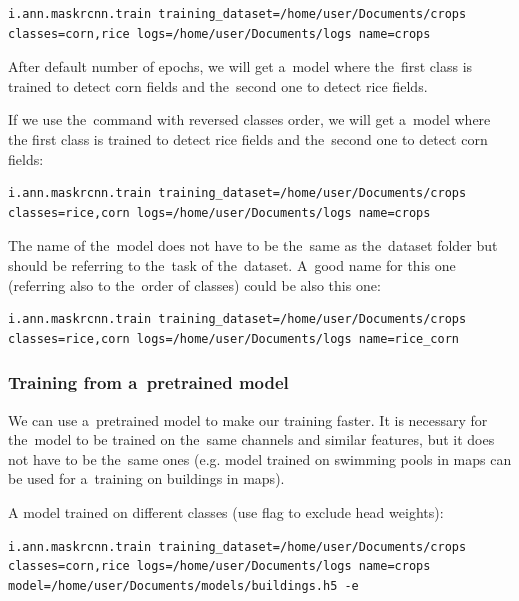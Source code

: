 {\footnotesize
\begin{lstlisting}[breaklines=true]
i.ann.maskrcnn.train training_dataset=/home/user/Documents/crops classes=corn,rice logs=/home/user/Documents/logs name=crops
\end{lstlisting}
}

After default number of epochs, we will get a~model where the~first class is
trained to detect corn fields and the~second one to detect rice fields. 

If we use the~command with reversed classes order, we will get a~model where
the first class is trained to detect rice fields and the~second one to detect
corn fields:

{\footnotesize
\begin{lstlisting}[breaklines=true]
i.ann.maskrcnn.train training_dataset=/home/user/Documents/crops classes=rice,corn logs=/home/user/Documents/logs name=crops
\end{lstlisting}
}

The name of the~model does not have to be the~same as the~dataset folder but
should be referring to the~task of the~dataset. A~good name for this one
(referring also to the~order of classes) could be also this one: 

{\footnotesize
\begin{lstlisting}[breaklines=true]
i.ann.maskrcnn.train training_dataset=/home/user/Documents/crops classes=rice,corn logs=/home/user/Documents/logs name=rice_corn
\end{lstlisting}
}

\subsubsection*{Training from a~pretrained model}
We can use a~pretrained model to make our training faster. It is necessary for
the~model to be trained on the~same channels and similar features, but it does
not have to be the~same ones (e.g. model trained on swimming pools in maps can
be used for a~training on buildings in maps). 

A model trained on different classes (use  flag to
exclude head weights):

{\footnotesize
\begin{lstlisting}[breaklines=true]
i.ann.maskrcnn.train training_dataset=/home/user/Documents/crops classes=corn,rice logs=/home/user/Documents/logs name=crops model=/home/user/Documents/models/buildings.h5 -e
\end{lstlisting}
}

